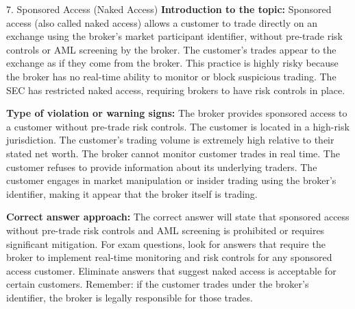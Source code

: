 \documentclass[11pt,a4paper]{beamer}
\begin{document}
\begin{frame}{7. Sponsored Access (Naked Access)}
\tiny
\noindent\textbf{Introduction to the topic:} Sponsored access (also called naked access) allows a customer to trade directly on an exchange using the broker's market participant identifier, without pre-trade risk controls or AML screening by the broker. The customer's trades appear to the exchange as if they come from the broker. This practice is highly risky because the broker has no real-time ability to monitor or block suspicious trading. The SEC has restricted naked access, requiring brokers to have risk controls in place.

\vspace{0.1cm}
\noindent\textbf{Type of violation or warning signs:} The broker provides sponsored access to a customer without pre-trade risk controls. The customer is located in a high-risk jurisdiction. The customer's trading volume is extremely high relative to their stated net worth. The broker cannot monitor customer trades in real time. The customer refuses to provide information about its underlying traders. The customer engages in market manipulation or insider trading using the broker's identifier, making it appear that the broker itself is trading.

\vspace{0.1cm}
\noindent\textbf{Correct answer approach:} The correct answer will state that sponsored access without pre-trade risk controls and AML screening is prohibited or requires significant mitigation. For exam questions, look for answers that require the broker to implement real-time monitoring and risk controls for any sponsored access customer. Eliminate answers that suggest naked access is acceptable for certain customers. Remember: if the customer trades under the broker's identifier, the broker is legally responsible for those trades.
\end{frame}
\end{document}
